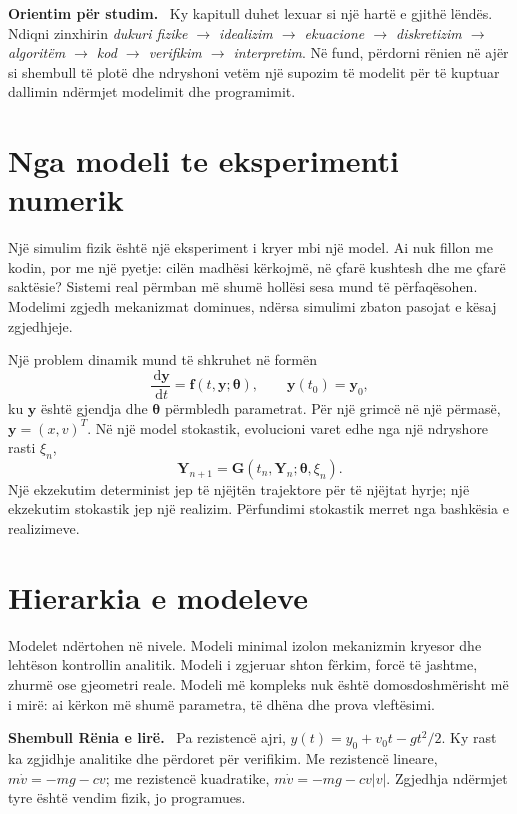 \documentclass[11pt,oneside,openany]{book}
\newcommand{\vect}[1]{\bm{#1}}
\newcommand{\dd}{\,\mathrm{d}}
\newenvironment{shembull}[1][]{\par\medskip\noindent\textbf{Shembull #1.}\ }{\par\medskip}
\newenvironment{orientim}{\par\medskip\noindent\textbf{Orientim për studim.}\ }{\par\medskip}
\begin{document}
\begin{orientim}
Ky kapitull duhet lexuar si një hartë e gjithë lëndës. Ndiqni zinxhirin
\emph{dukuri fizike $\rightarrow$ idealizim $\rightarrow$ ekuacione
$\rightarrow$ diskretizim $\rightarrow$ algoritëm $\rightarrow$ kod
$\rightarrow$ verifikim $\rightarrow$ interpretim}. Në fund, përdorni rënien
në ajër si shembull të plotë dhe ndryshoni vetëm një supozim të modelit për të
kuptuar dallimin ndërmjet modelimit dhe programimit.
\end{orientim}


\section{Nga modeli te eksperimenti numerik}
Një simulim fizik është një eksperiment i kryer mbi një model. Ai nuk fillon me kodin, por me një pyetje: cilën madhësi kërkojmë, në çfarë kushtesh dhe me çfarë saktësie? Sistemi real përmban më shumë hollësi sesa mund të përfaqësohen. Modelimi zgjedh mekanizmat dominues, ndërsa simulimi zbaton pasojat e kësaj zgjedhjeje.

Një problem dinamik mund të shkruhet në formën
\begin{equation}
 \frac{\dd \vect y}{\dd t}=\vect f(t,\vect y;\vect\theta),\qquad \vect y(t_0)=\vect y_0,
\end{equation}
ku $\vect y$ është gjendja dhe $\vect\theta$ përmbledh parametrat. Për një grimcë në një përmasë, $\vect y=(x,v)^T$. Në një model stokastik, evolucioni varet edhe nga një ndryshore rasti $\xi_n$,
\begin{equation}
 \vect Y_{n+1}=\vect G(t_n,\vect Y_n;\vect\theta,\xi_n).
\end{equation}
Një ekzekutim determinist jep të njëjtën trajektore për të njëjtat hyrje; një ekzekutim stokastik jep një realizim. Përfundimi stokastik merret nga bashkësia e realizimeve.

\section{Hierarkia e modeleve}
Modelet ndërtohen në nivele. Modeli minimal izolon mekanizmin kryesor dhe lehtëson kontrollin analitik. Modeli i zgjeruar shton fërkim, forcë të jashtme, zhurmë ose gjeometri reale. Modeli më kompleks nuk është domosdoshmërisht më i mirë: ai kërkon më shumë parametra, të dhëna dhe prova vleftësimi.

\begin{shembull}[Rënia e lirë]
Pa rezistencë ajri, $y(t)=y_0+v_0t-gt^2/2$. Ky rast ka zgjidhje analitike dhe përdoret për verifikim. Me rezistencë lineare, $m\dot v=-mg-cv$; me rezistencë kuadratike, $m\dot v=-mg-cv|v|$. Zgjedhja ndërmjet tyre është vendim fizik, jo programues.
\end{shembull}
\end{document}
